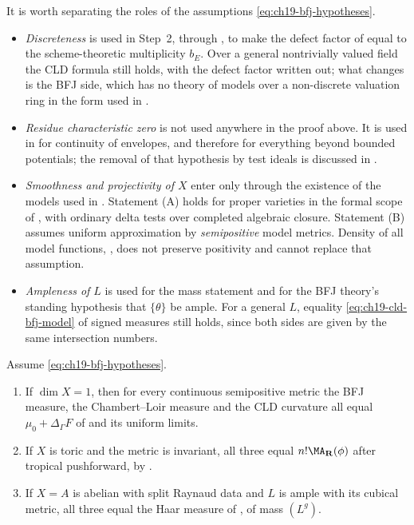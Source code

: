 \begin{remark}
\label{rem:ch19-cld-bfj-hypotheses}
It is worth separating the roles of the assumptions
\eqref{eq:ch19-bfj-hypotheses}.
\begin{itemize}
\item \emph{Discreteness} is used in Step~2, through
, to make the defect factor of
 equal to the scheme-theoretic
multiplicity $b_E$.  Over a general nontrivially valued field the CLD
formula still holds, with the defect factor written out; what changes is the
BFJ side, which has no theory of models over a non-discrete valuation ring
in the form used in .
\item \emph{Residue characteristic zero} is not used anywhere in the proof
above.  It is used in  for continuity of envelopes, and
therefore for everything beyond bounded potentials; the removal of that
hypothesis by test ideals is discussed in
.
\item \emph{Smoothness and projectivity of $X$} enter only through the
existence of the models used in .  Statement (A) holds for
proper varieties in the formal scope of
, with ordinary delta tests over completed
algebraic closure.  Statement (B) assumes uniform approximation by
\emph{semipositive} model metrics.  Density of all model functions,
, does not preserve positivity
and cannot replace that assumption.
\item \emph{Ampleness of $L$} is used for the mass statement and for the
BFJ theory's standing hypothesis that $\{\theta\}$ be ample.  For a
general $L$, equality \eqref{eq:ch19-cld-bfj-model} of signed measures
still holds, since both sides are given by the same intersection numbers.
\end{itemize}
\end{remark}

\begin{corollary}
\label{cor:ch19-transfer}
Assume \eqref{eq:ch19-bfj-hypotheses}.
\begin{enumerate}
\item\label{itm:ch19-tr:curve} If $\dim X=1$, then for every continuous
 semipositive metric the BFJ measure, the Chambert--Loir measure and the CLD
 curvature all equal $\mu_0+\Delta_\Gamma F$ of
  and its uniform limits.
\item\label{itm:ch19-tr:toric} If $X$ is toric and the metric is
 invariant, all three equal $n!\MA_{\mathbf R}(\phi)$ after tropical
 pushforward, by .
\item\label{itm:ch19-tr:abelian} If $X=A$ is abelian with split Raynaud
 data and $L$ is ample with its cubical metric, all three equal the Haar
 measure of , of mass $(L^g)$.
\end{enumerate}
\end{corollary}

